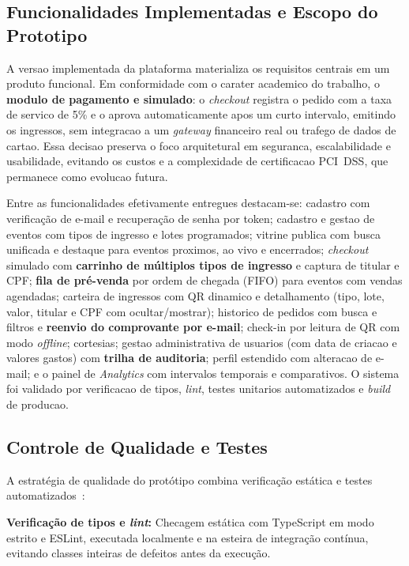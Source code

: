 \subsection{Funcionalidades Implementadas e Escopo do Prototipo}

A versao implementada da plataforma materializa os requisitos centrais em um produto funcional. Em conformidade com o carater academico do trabalho, o \textbf{modulo de pagamento e simulado}: o \textit{checkout} registra o pedido com a taxa de servico de 5\% e o aprova automaticamente apos um curto intervalo, emitindo os ingressos, sem integracao a um \textit{gateway} financeiro real ou trafego de dados de cartao. Essa decisao preserva o foco arquitetural em seguranca, escalabilidade e usabilidade, evitando os custos e a complexidade de certificacao PCI~DSS, que permanece como evolucao futura.

Entre as funcionalidades efetivamente entregues destacam-se: cadastro com verificação de e-mail e recuperação de senha por token; cadastro e gestao de eventos com tipos de ingresso e lotes programados; vitrine publica com busca unificada e destaque para eventos proximos, ao vivo e encerrados; \textit{checkout} simulado com \textbf{carrinho de múltiplos tipos de ingresso} e captura de titular e CPF; \textbf{fila de pré-venda} por ordem de chegada (FIFO) para eventos com vendas agendadas; carteira de ingressos com QR dinamico e detalhamento (tipo, lote, valor, titular e CPF com ocultar/mostrar); historico de pedidos com busca e filtros e \textbf{reenvio do comprovante por e-mail}; check-in por leitura de QR com modo \textit{offline}; cortesias; gestao administrativa de usuarios (com data de criacao e valores gastos) com \textbf{trilha de auditoria}; perfil estendido com alteracao de e-mail; e o painel de \textit{Analytics} com intervalos temporais e comparativos. O sistema foi validado por verificacao de tipos, \textit{lint}, testes unitarios automatizados e \textit{build} de producao.

\subsection{Controle de Qualidade e Testes}

A estratégia de qualidade do protótipo combina verificação estática e testes automatizados~\cite{Pressman:2019}:

\textbf{Verificação de tipos e \textit{lint}:} Checagem estática com TypeScript em modo estrito e ESLint, executada localmente e na esteira de integração contínua, evitando classes inteiras de defeitos antes da execução.

